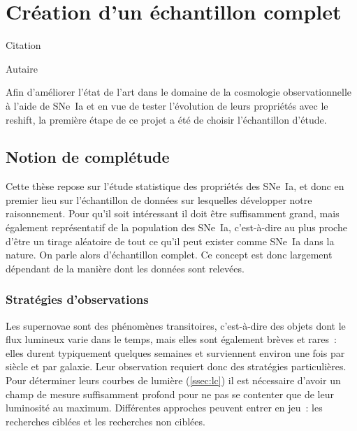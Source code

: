 \documentclass[../main/main.tex]{subfiles}
\begin{document}
\chapter{Cr\'eation d'un \'echantillon complet}\label{ch:sample}

\epigraph{Citation}{Autaire}
Afin d'améliorer l'état de l'art dans le domaine de la cosmologie
observationnelle à l'aide de SNe~Ia et en vue de tester l'évolution de leurs
propriétés avec le reshift, la première étape de ce projet a été de choisir
l'échantillon d'étude.

\vfill
\minitoc
\vfill
\newpage

\section{Notion de complétude}\label{sec:compl}


Cette thèse repose sur l'étude statistique des propriétés des SNe~Ia, et  donc
en premier lieu sur l'échantillon de données sur lesquelles développer notre
raisonnement. Pour qu'il soit intéressant il doit être suffisamment grand, mais
également représentatif de la population des SNe~Ia, c'est-à-dire au plus proche
d'être un tirage aléatoire de tout ce qu'il peut exister comme SNe~Ia dans la
nature. On parle alors d'échantillon complet. Ce concept est donc largement
dépendant de la manière dont les données sont relevées.

\subsection{Stratégies d'observations}\label{ssec:startobs}

Les supernovae sont des phénomènes transitoires, c'est-à-dire des objets dont le
flux lumineux varie dans le temps, mais elles sont également brèves et rares~:
elles durent typiquement quelques semaines et surviennent environ une fois par
siècle et par galaxie. Leur observation requiert donc des stratégies
particulières. Pour déterminer leurs courbes de lumière (\ref{ssec:lc}) il est
nécessaire d'avoir un champ de mesure suffisamment profond pour ne pas se
contenter que de leur luminosité au maximum. Différentes approches peuvent
entrer en jeu~: les recherches ciblées et les recherches non ciblées.
\end{document}
